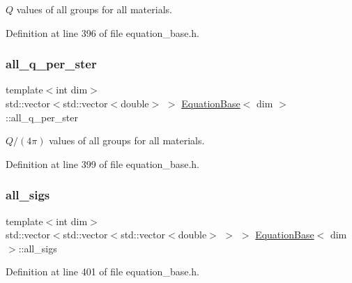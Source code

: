 $Q$ values of all groups for all materials. 



Definition at line 396 of file equation\+\_\+base.\+h.

\mbox{\label{class_equation_base_a6a633374c56fe767325b5c0860269fbf}} 
\subsubsection{\texorpdfstring{all\+\_\+q\+\_\+per\+\_\+ster}{all\_q\_per\_ster}}
{\footnotesize\ttfamily template$<$int dim$>$ \\
std\+::vector$<$std\+::vector$<$double$>$ $>$ \hyperlink{class_equation_base}{Equation\+Base}$<$ dim $>$\+::all\+\_\+q\+\_\+per\+\_\+ster\hspace{0.3cm}{\ttfamily [protected]}}



$Q/(4\pi)$ values of all groups for all materials. 



Definition at line 399 of file equation\+\_\+base.\+h.

\mbox{\label{class_equation_base_a6775388f6b8dcd903a0f95443b2e8c0d}} 
\subsubsection{\texorpdfstring{all\+\_\+sigs}{all\_sigs}}
{\footnotesize\ttfamily template$<$int dim$>$ \\
std\+::vector$<$std\+::vector$<$std\+::vector$<$double$>$ $>$ $>$ \hyperlink{class_equation_base}{Equation\+Base}$<$ dim $>$\+::all\+\_\+sigs\hspace{0.3cm}{\ttfamily [protected]}}



Definition at line 401 of file equation\+\_\+base.\+h.

\mbox{\label{class_equation_base_abf2c1a575944b0661bb48e2380c269a0}} 
